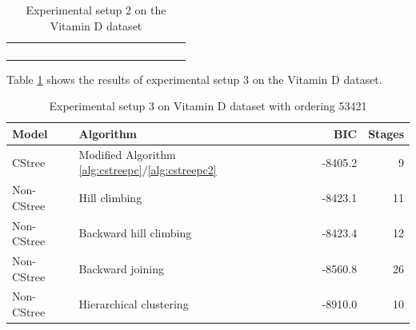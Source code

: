 \documentclass{tufte-book}
\begin{document}
\begin{table}[]
\begin{tabular}{cccccccccccccccc}
                        &                                                                                               &                             &                              &                             &                              &                                 &                              &                             &                                       &                             &                              &  &  &  &  \\
                        &                                                                                               &                             &                              &                             &                              &                                 &                              &                             &                                       &                             & \textbf{}                    &  &  &  &  \\
                        &                                                                                               &                             &                              &                             &                              &                                 &                              &                             &                                       &                             &                              &  &  &  &  \\
                        &                                                                                               &                             &                              &                             &                              &                                 &                              &                             &                                       &                             &                              &  &  &  & 

\caption{Experimental setup 2 on the Vitamin D dataset}
			\end{tabular}
\end{table}
 \newpage 
   Table \ref{tab:org44abd29} shows the results of experimental setup 3 on the Vitamin D dataset.

\begin{table}[htbp]
\caption{\label{tab:org44abd29}Experimental setup 3 on Vitamin D dataset with ordering 53421}
\centering
\begin{tabular}{l|l|r|r}
\hline
Model & Algorithm & BIC & Stages\\
\hline
CStree & Modified Algorithm \ref{alg:cstreepc}/\ref{alg:cstreepc2} & -8405.2 & 9\\
Non-CStree & Hill climbing & -8423.1 & 11\\
Non-CStree & Backward hill climbing & -8423.4 & 12\\
Non-CStree & Backward joining & -8560.8 & 26\\
Non-CStree & Hierarchical clustering & -8910.0 & 10\\
\end{tabular}
\end{table}
\end{document}
